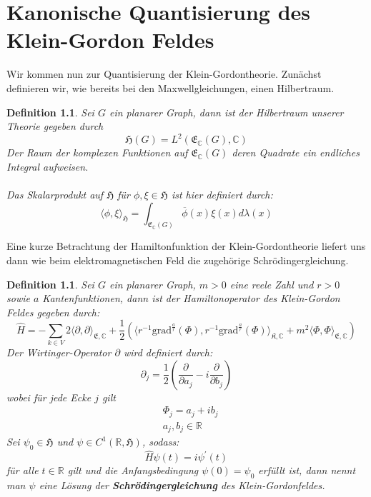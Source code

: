 \documentclass[11pt,a4paper,leqno]{report}
\newtheorem{definition}[theorem]{Definition}
\numberwithin{equation}{chapter}
\begin{document}
\chapter{Kanonische Quantisierung des Klein-Gordon Feldes}
Wir kommen nun zur Quantisierung der Klein-Gordontheorie.
Zun\"achst definieren wir, wie bereits bei den Maxwellgleichungen, einen Hilbertraum.
\begin{definition}
	Sei $G$ ein planarer Graph, dann ist der Hilbertraum unserer Theorie gegeben durch
	\begin{equation}
		\mathfrak{H}(G) = L^2(\mathfrak{E}_\mathbb{C}(G),\mathbb{C})
	\end{equation}
	Der Raum der komplexen Funktionen auf $\mathfrak{E}_\mathbb{C}(G)$ deren Quadrate ein endliches Integral aufweisen.\\
	\\
	Das Skalarprodukt auf $\mathfrak{H}$ f\"ur $\phi,\xi\in \mathfrak{H}$ ist hier definiert durch:
	\begin{equation}
		\langle \phi, \xi\rangle_{\mathfrak{H}} = \int_{\mathfrak{E}_\mathbb{C}(G)} \overline{\phi}(x)\xi(x)d\lambda(x)
	\end{equation}
\end{definition}
\noindent
Eine kurze Betrachtung der Hamiltonfunktion der Klein-Gordontheorie liefert uns dann wie beim elektromagnetischen Feld die zugeh\"orige Schr\"odingergleichung.
\begin{definition}
	Sei $G$ ein planarer Graph, $m>0$ eine reele Zahl und $r>0$ sowie $a$ Kantenfunktionen, dann ist der Hamiltonoperator des Klein-Gordon Feldes gegeben durch:
	\begin{equation}
		\hat{H}=-\sum_{k\in V}2\langle\partial,\partial\rangle_{\mathfrak{E},\mathbb{C}} + \frac{1}{2}(\langle r^{-1}\text{grad}^{\frac{a}{r}}(\Phi), r^{-1}\text{grad}^{\frac{a}{r}}(\Phi)\rangle_{\mathfrak{K},\mathbb{C}}+ m^2\langle\Phi, \Phi\rangle_{\mathfrak{E},\mathbb{C}})
	\end{equation}
	Der Wirtinger-Operator $\partial$ wird definiert durch:
	\begin{equation}
		\partial_j =\frac{1}{2}(\frac{\partial}{\partial a_j} - i\frac{\partial}{\partial b_j})
	\end{equation}
	wobei f\"ur jede Ecke $j$ gilt
	\begin{align*}
	&\Phi_j = a_j + ib_j\\
	&a_j, b_j\in \mathbb{R}
	\end{align*}
	Sei $\psi_0\in\mathfrak{H}$ und $\psi\in C^1(\mathbb{R},\mathfrak{H})$, sodass:
	\begin{equation}
		\hat{H}\psi(t) = i\psi^\prime(t)
	\end{equation}
	f\"ur alle $t\in\mathbb{R}$ gilt und die Anfangsbedingung $\psi(0)=\psi_0$ erf\"ullt ist, dann nennt man $\psi$ eine L\"osung der
	\textbf{Schr\"odingergleichung} des Klein-Gordonfeldes.
\end{definition}
\end{document}
